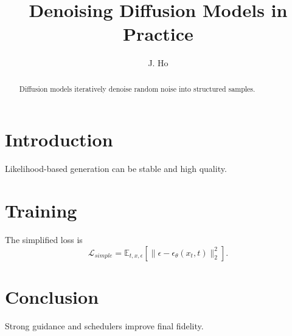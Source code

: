 \documentclass[sigconf]{acmart}
\title{Denoising Diffusion Models in Practice}
\author{J. Ho}
\affiliation{\institution{Open Research Lab}\country{USA}}
\begin{document}
\begin{abstract}
Diffusion models iteratively denoise random noise into structured samples.
\end{abstract}
\maketitle
\section{Introduction}
Likelihood-based generation can be stable and high quality.
\section{Training}
The simplified loss is
\begin{equation}
\mathcal{L}_{simple}=\mathbb{E}_{t,x,\epsilon}\left[\|\epsilon-\epsilon_\theta(x_t,t)\|_2^2\right].
\end{equation}
\section{Conclusion}
Strong guidance and schedulers improve final fidelity.


\end{document}
